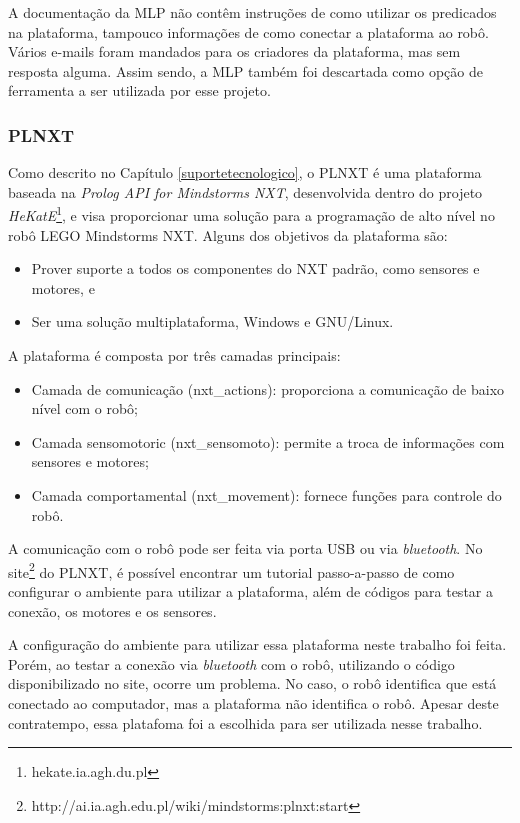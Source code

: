 A documentação da MLP não contêm instruções de como utilizar os predicados na plataforma, tampouco informações de como conectar a plataforma ao robô. Vários e-mails foram mandados para os criadores da plataforma, mas sem resposta alguma. Assim sendo, a MLP também foi descartada como opção de ferramenta a ser utilizada por esse projeto.

\subsubsection[PLNXT]{PLNXT}
Como descrito no Capítulo \ref{suportetecnologico}, o PLNXT é uma plataforma baseada na \textit{Prolog API for Mindstorms NXT}, desenvolvida dentro do projeto \textit{HeKatE}\footnote{hekate.ia.agh.du.pl}, e visa proporcionar uma solução para a programação de alto nível no robô LEGO Mindstorms NXT. Alguns dos objetivos da plataforma são:
\begin{itemize}
\item Prover suporte a todos os componentes do NXT padrão, como sensores e motores, e
\item Ser uma solução multiplataforma, Windows e GNU/Linux.
\end{itemize}
A plataforma é composta por três camadas principais:
\begin{itemize}
\item Camada de comunicação (nxt\_actions): proporciona a comunicação de baixo nível com o robô;
\item Camada sensomotoric (nxt\_sensomoto): permite a troca de informações com sensores e motores;
\item Camada comportamental (nxt\_movement): fornece funções para controle do robô.
\end{itemize}
A comunicação com o robô pode ser feita via porta USB ou via \textit{bluetooth}. No site\footnote{http://ai.ia.agh.edu.pl/wiki/mindstorms:plnxt:start} do PLNXT, é possível encontrar um tutorial passo-a-passo de como configurar o ambiente para utilizar a plataforma, além de códigos para testar a conexão, os motores e os sensores.

A configuração do ambiente para utilizar essa plataforma neste trabalho foi feita. Porém, ao testar a conexão via \textit{bluetooth} com o robô, utilizando o código disponibilizado no site, ocorre um problema. No caso, o robô identifica que está conectado ao computador, mas a plataforma não identifica o robô. Apesar deste contratempo, essa platafoma foi a escolhida para ser utilizada nesse trabalho.

